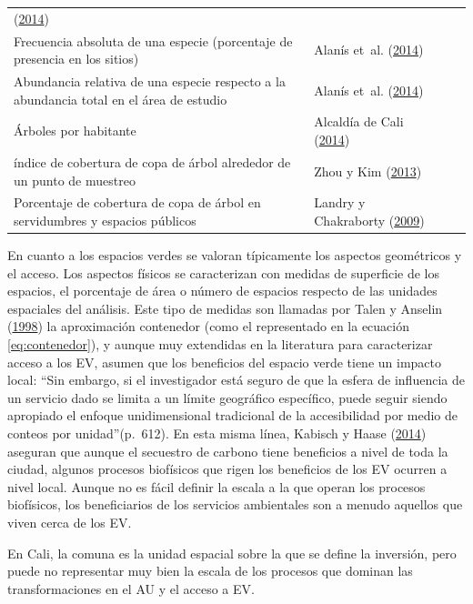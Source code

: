 \documentclass[12pt,a4paper,oneside, openany]{book}
\theoremstyle{definition}
\theoremstyle{definition}
\theoremstyle{definition}
\theoremstyle{remark}
\begin{document}
\begin{table}[t]
\begin{tabular}{>{\raggedleft\arraybackslash}p{8cm}>{\raggedleft\arraybackslash}p{6cm}rr}
(\protect\hyperlink{ref-alanis_estructura_2014}{2014})\\
Frecuencia absoluta de una especie (porcentaje de presencia en los sitios) & Alanís et~al.
(\protect\hyperlink{ref-alanis_estructura_2014}{2014})\\
Abundancia relativa de una especie respecto a la abundancia total en el área de estudio & Alanís et~al.
(\protect\hyperlink{ref-alanis_estructura_2014}{2014})\\
\addlinespace
Árboles por habitante & Alcaldía de Cali
(\protect\hyperlink{ref-pot2014cali}{2014})\\
índice de cobertura de copa de árbol alrededor de un punto de muestreo & Zhou y Kim
(\protect\hyperlink{ref-zhou_social_2013}{2013})\\
Porcentaje de cobertura de copa de árbol en servidumbres y espacios públicos & Landry y Chakraborty
(\protect\hyperlink{ref-landry_street_2009}{2009})\\
\bottomrule
\end{tabular}
\end{table}

En cuanto a los espacios verdes se valoran típicamente los aspectos
geométricos y el acceso. Los aspectos físicos se caracterizan con
medidas de superficie de los espacios, el porcentaje de área o número de
espacios respecto de las unidades espaciales del análisis. Este tipo de
medidas son llamadas por Talen y Anselin
(\protect\hyperlink{ref-talen_assessing_1998}{1998}) la aproximación
contenedor (como el representado en la ecuación \eqref{eq:contenedor}), y
aunque muy extendidas en la literatura para caracterizar acceso a los
EV, asumen que los beneficios del espacio verde tiene un impacto local:
``Sin embargo, si el investigador está seguro de que la esfera de
influencia de un servicio dado se limita a un límite geográfico
específico, puede seguir siendo apropiado el enfoque unidimensional
tradicional de la accesibilidad por medio de conteos por
unidad''(p.~612). En esta misma línea, Kabisch y Haase
(\protect\hyperlink{ref-kabisch_green_2014}{2014}) aseguran que aunque
el secuestro de carbono tiene beneficios a nivel de toda la ciudad,
algunos procesos biofísicos que rigen los beneficios de los EV ocurren a
nivel local. Aunque no es fácil definir la escala a la que operan los
procesos biofísicos, los beneficiarios de los servicios ambientales son
a menudo aquellos que viven cerca de los EV.

En Cali, la comuna es la unidad espacial sobre la que se define la
inversión, pero puede no representar muy bien la escala de los procesos
que dominan las transformaciones en el AU y el acceso a EV.
\end{document}
